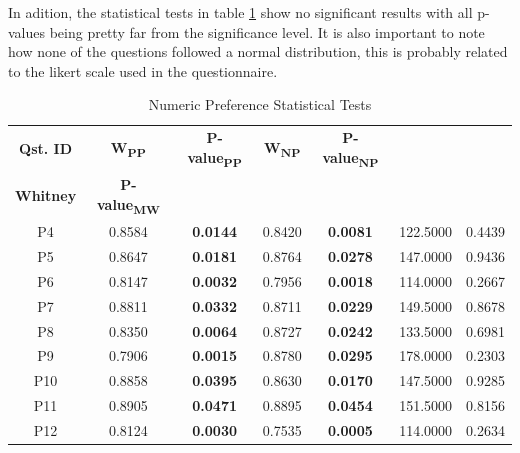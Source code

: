 In adition, the statistical tests in table \ref{tab:numeric_statistics} show no significant results 
with all p-values being pretty far from the significance level. It is also important to note how none 
of the questions followed a normal distribution, this is probably related to the likert scale used in the questionnaire.
\begin{table}[H]
    \centering
    \small
    \setlength{\tabcolsep}{4pt}
    \renewcommand{\arraystretch}{1.5}
    \caption{Numeric Preference Statistical Tests}
    \label{tab:numeric_statistics}

    \begin{tabular}{|c|c|c|c|c|c|c|}
        \hline
        \textbf{Qst. ID} & \textbf{W\textsubscript{PP}} & \textbf{P-value\textsubscript{PP}} & \textbf{W\textsubscript{NP}} & \textbf{P-value\textsubscript{NP}} & \shortstack{\textbf{Mann-}\\ \textbf{Whitney}} & \textbf{P-value\textsubscript{MW}} \\ \hline
        P4 & 0.8584 & \textbf{\color{red}0.0144} & 0.8420 & \textbf{\color{red}0.0081} & 122.5000 & 0.4439 \\ \hline
        P5 & 0.8647 & \textbf{\color{red}0.0181} & 0.8764 & \textbf{\color{red}0.0278} & 147.0000 & 0.9436 \\ \hline
        P6 & 0.8147 & \textbf{\color{red}0.0032} & 0.7956 & \textbf{\color{red}0.0018} & 114.0000 & 0.2667 \\ \hline
        P7 & 0.8811 & \textbf{\color{red}0.0332} & 0.8711 & \textbf{\color{red}0.0229} & 149.5000 & 0.8678 \\ \hline
        P8 & 0.8350 & \textbf{\color{red}0.0064} & 0.8727 & \textbf{\color{red}0.0242} & 133.5000 & 0.6981 \\ \hline
        P9 & 0.7906 & \textbf{\color{red}0.0015} & 0.8780 & \textbf{\color{red}0.0295} & 178.0000 & 0.2303 \\ \hline
        P10 & 0.8858 & \textbf{\color{red}0.0395} & 0.8630 & \textbf{\color{red}0.0170} & 147.5000 & 0.9285 \\ \hline
        P11 & 0.8905 & \textbf{\color{red}0.0471} & 0.8895 & \textbf{\color{red}0.0454} & 151.5000 & 0.8156 \\ \hline
        P12 & 0.8124 & \textbf{\color{red}0.0030} & 0.7535 & \textbf{\color{red}0.0005} & 114.0000 & 0.2634 \\ \hline

    \end{tabular}
\end{table}